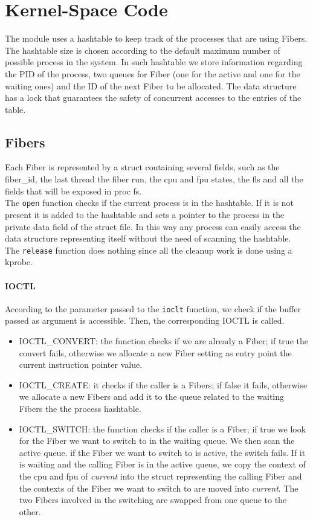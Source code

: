\documentclass[11pt]{article}
\begin{document}
\section{Kernel-Space Code} 
The module uses a hashtable to keep track of the processes that are using Fibers. The hashtable size is chosen according to the default maximum number of possible process in the system. In such hashtable we store information regarding the PID of the process, two queues for Fiber (one for the active and one for the waiting ones) and the ID of the next Fiber to be allocated. The data structure has a lock that guarantees the safety of concurrent accesses to the entries of the table.

\subsection{Fibers}
Each Fiber is represented by a struct containing several fields, such as the fiber\_id, the last thread the fiber run, the cpu and fpu states, the fls and all the fields that will be exposed in proc fs.\\
The \texttt{open} function checks if the current process is in the hashtable. If it is not present it is added to the hashtable and sets a pointer to the process in the private data field of the struct file. In this way any process can easily access the data structure representing itself without the need of scanning the hashtable.\\
The \texttt{release} function does nothing since all the cleanup work is done using a kprobe.\\
\paragraph{IOCTL}
According to the parameter passed to the \texttt{ioclt} function, we check if the buffer passed as argument is accessible. Then, the corresponding IOCTL is called.
\begin{itemize}
\item IOCTL\_CONVERT: the function checks if we are already a Fiber; if true the convert fails, otherwise we allocate a new Fiber setting as entry point the current instruction pointer value.
\item IOCTL\_CREATE: it checks if the caller is a Fibers; if false it fails, otherwise we allocate a new Fibers and add it to the queue related to the waiting Fibers the the process hashtable. 
\item IOCTL\_SWITCH: the function checks if the caller is a Fiber; if true we look for the Fiber we want to switch to in the waiting queue. We then scan the active queue. if the Fiber we want to switch to is active, the switch fails. If it is waiting and the calling Fiber is in the active queue, we copy the context of the cpu and fpu of \textit{current} into the struct representing the calling Fiber and the contexts of the Fiber we want to switch to are moved into \textit{current}. The two Fibers involved in the switching are swapped from one queue to the other.
\end{itemize}
\end{document}
